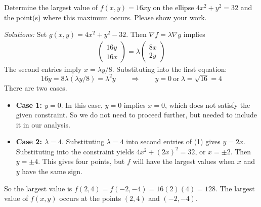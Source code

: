 
\ifnum {}
    \question[6] Determine the largest value of $f(x,y) = 16xy$ on the ellipse $4x^2+y^2=32$ and the point(s) where this maximum occurs. Please show your work. 
    
    \ifnum {} {\color{DarkBlue} \textit{Solutions:} Set $g(x,y) = 4x^2 +y^2 - 32$. Then $\nabla f = \lambda \nabla g$ implies
    \begin{align}
        \begin{pmatrix} 16y\\16x\end{pmatrix} = \lambda \begin{pmatrix} 8x\\2y\end{pmatrix}
    \end{align}
    The second entries imply $x=\lambda y/8$. Substituting into the first equation: 
    $$16y = 8\lambda (\lambda y /8) = \lambda^2 y \qquad \Rightarrow \qquad y=0 \ \text{or} \ \lambda = \sqrt{16} = 4 $$
    There are two cases. 
    \begin{itemize}
        \item \textbf{Case 1: $y =0$}. In this case, $y=0$ implies $x=0$, which does not satisfy the given constraint. So we do not need to proceed further, but needed to include it in our analysis. 
        \item \textbf{Case 2: $\lambda = 4$}. Substituting $\lambda =4$ into second entries of (1) gives $y=2x$. Substituting into the constraint yields $4x^2 + (2x)^2 = 32$, or $x = \pm 2$. Then $y=\pm4$. This gives four points, but $f$ will have the largest values when $x$ and $y$ have the same sign.
    \end{itemize}
    So the largest value is $f(2,4)=f(-2,-4) = 16(2)(4) = 128$. The largest value of $f(x,y)$ occurs at the points $(2,4)$ and $(-2,-4)$. 
} 
\else
\fi        
\fi

